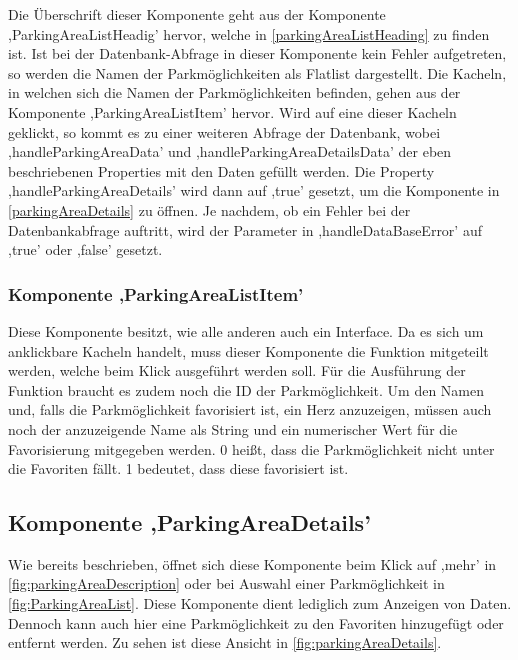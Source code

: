 Die Überschrift dieser Komponente geht aus der Komponente ,ParkingAreaListHeadig' hervor, welche in \autoref{parkingAreaListHeading} zu finden ist. Ist bei der Datenbank-Abfrage in dieser Komponente kein Fehler aufgetreten, so werden die Namen der Parkmöglichkeiten als Flatlist dargestellt. Die Kacheln, in welchen sich die Namen der Parkmöglichkeiten befinden, gehen aus der Komponente ,ParkingAreaListItem' hervor. Wird auf eine dieser Kacheln geklickt, so kommt es zu einer weiteren Abfrage der Datenbank, wobei ,handleParkingAreaData' und ,handleParkingAreaDetailsData' der eben beschriebenen Properties mit den Daten gefüllt werden. Die Property ,handleParkingAreaDetails' wird dann auf ,true' gesetzt, um die Komponente in \autoref{parkingAreaDetails} zu öffnen. Je nachdem, ob ein Fehler bei der Datenbankabfrage auftritt, wird der Parameter in ,handleDataBaseError' auf ,true' oder ,false' gesetzt.

\subsubsection{Komponente ,ParkingAreaListItem'}
\label{parkingAreaListItem}
Diese Komponente besitzt, wie alle anderen auch ein Interface. Da es sich um anklickbare Kacheln handelt, muss dieser Komponente die Funktion mitgeteilt werden, welche beim Klick ausgeführt werden soll. Für die Ausführung der Funktion braucht es zudem noch die ID der Parkmöglichkeit. Um den Namen und, falls die Parkmöglichkeit favorisiert ist, ein Herz anzuzeigen, müssen auch noch der anzuzeigende Name als String und ein numerischer Wert für die Favorisierung mitgegeben werden. 0 heißt, dass die Parkmöglichkeit nicht unter die Favoriten fällt. 1 bedeutet, dass diese favorisiert ist.

\subsection{Komponente ,ParkingAreaDetails'}
\label{parkingAreaDetails}
Wie bereits beschrieben, öffnet sich diese Komponente beim Klick auf ,mehr' in \autoref{fig:parkingAreaDescription} oder bei Auswahl einer Parkmöglichkeit in \autoref{fig:ParkingAreaList}. Diese Komponente dient lediglich zum Anzeigen von Daten. Dennoch kann auch hier eine Parkmöglichkeit zu den Favoriten hinzugefügt oder entfernt werden. Zu sehen ist diese Ansicht in \autoref{fig:parkingAreaDetails}.

